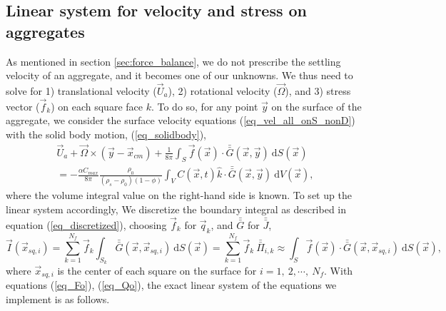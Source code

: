  \subsection{Linear system for velocity and stress on aggregates}
As mentioned in section \ref{sec:force_balance}, we do not prescribe the settling velocity of an aggregate, and it becomes one of our unknowns.
We thus need to solve for 1) translational velocity ($\vec{U}_a$), 2) rotational velocity ($\vec{\Omega}$), and 3) stress vector ($\vec{f}_k$) on each square face $k$.
To do so, for any point $\vec{y}$ on the surface of the aggregate, we consider the surface velocity equations (\ref{eq_vel_all_onS_nonD}) with the solid body motion, (\ref{eq_solidbody}), 
 \begin{align}
	\vec{U}_a + \vec{\Omega} \times (\vec{y} - \vec{x}_{cm})
+ \frac{1}{8 \pi} \int_{S}  
		  \vec{f}(\vec{x}) 
		  \cdot \bar{\bar{G  }} (\vec{x},\vec{y}) 
		  \ \textrm{d}S(\vec{x})
		  \nonumber \\
=  -\frac{ \alpha C_{max}}{8\pi } \frac{\rho_0}{(\rho_s - \rho_0)(1-\phi)} 
\int_{V} C\left(\vec{x},  t \right) \hat{k} \cdot 
\bar{\bar{G}}(\vec{x}, \vec{y} ) 
\ \text{d}V(\vec{x}),
 \label{eq_slp_lin_eq}
 \end{align}
where the volume integral value on the right-hand side is known. 
To set up the linear system accordingly, We discretize the boundary integral as described in equation (\ref{eq_discretized}), choosing $\vec{f}_k$ for $\vec{q}_k$, and $ \bar{\bar{G}}$ for $\bar{\bar{J}}$, 
\begin{equation}
	\vec{I}(\vec{x}_{sq,i})  =   \sum_{k=1}^{N_f}  \vec{f}_k   \int_{S_{k}} \bar{\bar{G}}(\vec{x},\vec{x}_{sq,i}) \ \text{d}S(\vec{x}) 
	= \sum_{k=1}^{N_f} \vec{f}_k   \ \bar{\bar{\Pi}}_{i,k}
	\approx \int_{S}  
	\vec{f}(\vec{x}) 
	\cdot \bar{\bar{G  }} (\vec{x},\vec{x}_{sq,i}) 
	\ \textrm{d}S(\vec{x}),
\end{equation}
where $\vec{x}_{sq, i}$ is the center of each square on the surface for $i = 1, \  2, \cdots, \  N_f$.
With equations (\ref{eq_Fo}), (\ref{eq_Qo}), the exact linear system of the equations we implement is as follows.
